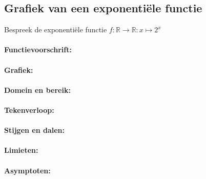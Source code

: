 \documentclass[12pt,twoside]{article}
\begin{document}
\subsection{Grafiek van een exponentiële functie}
\vspace*{-1cm}

\begin{oefening}
Bespreek de exponentiële functie $f:\mathbb{R}\to\mathbb{R}: x\mapsto 2^x$
\paragraph*{Functievoorschrift:}
\begin{center}
\visgraad{12cm}
\end{center}
\paragraph*{Grafiek:}
\begin{center}
\vspace*{-0.5cm}
\end{center}
\paragraph*{Domein en bereik:} \arulefill
\paragraph*{Tekenverloop:}
\begin{center}
\vspace*{-0.5cm}
\visgraad{5cm}
\end{center}
\paragraph*{Stijgen en dalen:}
\begin{center}
\vspace*{-0.5cm}
\visgraad{5cm}
\end{center}
\paragraph*{Limieten:} \arulefill
\paragraph*{Asymptoten:} \arulefill
\end{oefening}
\end{document}
